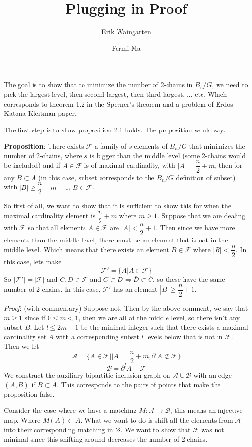 \documentclass[11pt]{article}
\author{Erik Waingarten \and Fermi Ma}
\title{Plugging in Proof}
\newcommand{\F}{\mathcal{F}}
\newcommand{\A}{\mathcal{A}}
\newcommand{\B}{\mathcal{B}}
\begin{document}
         
\maketitle

The goal is to show that to minimize the number of 2-chains in $B_n/G$, we need to pick the largest level, then second largest, then third largest, ... etc. Which corresponds to theorem 1.2 in the Sperner's theorem and a problem of Erdos-Katona-Kleitman paper.

The first step is to show proposition 2.1 holds. The proposition would say:

\textbf{Proposition}: There exists $\F$ a family of $s$ elements of $B_n/G$ that minimizes the number of 2-chains, where $s$ is bigger than the middle level (some 2-chains would be included) and if $A \in \F$ is of maximal cardinality, with $|A| = \dfrac{n}{2} + m$, then for any $B \subset A$ (in this case, subset corresponds to the $B_n/G$ definition of subset) with $|B| \geq \dfrac{n}{2} - m + 1$, $B \in \F$.

So first of all, we want to show that it is sufficient to show this for when the maximal cardinality element is $\dfrac{n}{2} + m$ where $m\geq 1$. Suppose that we are dealing with $\F$ so that all elements $A \in \F$ are $|A| < \dfrac{n}{2} + 1$. Then since we have more elements than the middle level, there must be an element that is not in the middle level. Which means that there exists an element $B \in \F$ where $|B| < \dfrac{n}{2}$. In this case, lets make 
\[ \F' = \{ \overline{A} | A \in \F \} \]
So $|\F'| = |\F|$ and $C, D \in \F$ and $C \subset D \iff \overline{D} \subset \overline{C}$, so these have the same number of 2-chains. In this case, $\F'$ has an element $|\overline{B}| \geq \dfrac{n}{2} + 1$. 

\textit{Proof}: (with commentary) Suppose not. Then by the above comment, we say that $m\geq 1$ since if $0\leq m<1$, then we are all at the middle level, so there isn't any subset $B$. Let $l \leq 2m - 1$ be the minimal integer such that there exists a maximal cardinality set $A$ with a corresponding subset $l$ levels below that is not in $\F$. Then we let 
\[ \A = \{ A \in \F | |A| = \dfrac{n}{2} + m, \partial^lA \not\subset \F \} \]
\[ \B = \partial^lA - \F \]
We construct the auxiliary bipartitie inclusion graph on $\A \cup \B$ with an edge $(A, B)$ if $B \subset A$. This corresponds to the pairs of points that make the proposition false. 

Consider the case where we have a matching $M: \A \rightarrow \B$, this means an injective map. Where $M(A) \subset A$. What we want to do is shift all the elements from $\A$ into their corresponding matching in $\B$. We want to show that $\F$ was not minimal since this shifting around decreases the number of 2-chains. 
\end{document}
